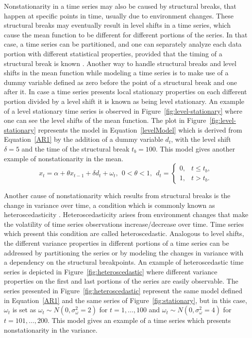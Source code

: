 \documentclass[11pt]{dippg}
\begin{document}
Nonstationarity in a time series may also be caused by structural breaks, that happen at specific points in time, usually due to environment changes. These structural breaks may eventually result in level shifts in a time series, which cause the mean function to be different for different portions of the series. In that case, a time series can be partitioned, and one can separately analyze each data portion with different statistical properties, provided that the timing of a structural break is known \cite{hanssens_market_2003}. Another way to handle structural breaks and level shifts in the mean function while modeling a time series is to make use of a dummy variable defined as zero before the point of a structural break and one after it. In case a time series presents local stationary properties on each different portion divided by a level shift it is known as being level stationary. An example of a level stationary time series is observed in Figure~\ref{fig:level-stationary} where one can see the level shifts of the mean function. The plot in Figure~\ref{fig:level-stationary} represents the model in Equation~\ref{levelModel} which is derived from Equation~\ref{AR1} by the addition of a dummy variable $d_t$, with the level shift $\delta = 5$ and the time of the structural break $t_b = 100$. This model gives another example of nonstationarity in the mean.
\begin{equation}\label{levelModel}
x_t = \alpha + {\theta}x_{t-1} + {\delta}d_t + \omega_t, \ \ 0 < \theta < 1, \ \ d_t = 
 \begin{cases}
 0, & \text{$t \le t_b$},\\
 1, & \text{$t > t_b$}.
 \end{cases}
\end{equation}

Another cause of nonstationarity which results from structural breaks is the change in variance over time, a condition which is commonly known as heteroscedasticity \cite{hanssens_market_2003,shumway_time_2017}. Heteroscedasticity arises from environment changes that make the volatility of time series observations increase/decrease over time. Time series which present this condition are called heteroscedastic. Analogous to level shifts, the different variance properties in different portions of a time series can be addressed by partitioning the series or by modeling the changes in variance with a dependency on the structural breakpoints. An example of heteroscedastic time series is depicted in Figure~\ref{fig:heteroscedastic} where different variance properties on the first and last portions of the series are easily observable. The series presented in Figure~\ref{fig:heteroscedastic} represent the same model defined in Equation~\ref{AR1} and the same series of Figure~\ref{fig:stationary}, but in this case, $\omega_t$ is set as $\omega_t \sim N(0, \sigma^2_\omega = 2)$ for $t = 1,\dots,100$ and $\omega_t \sim N(0, \sigma^2_\omega = 4)$ for $t = 101,\dots,200$. This model gives an example of a time series which presents nonstationarity in the variance.
\end{document}
